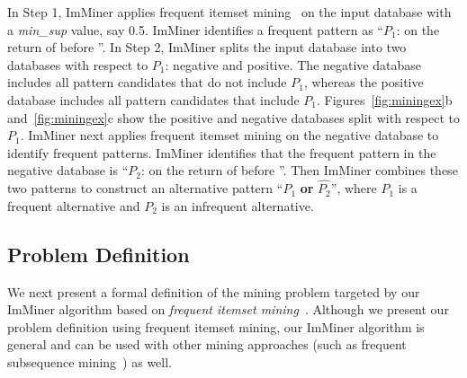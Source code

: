 In Step 1, ImMiner applies frequent itemset mining~\cite{Burdick01mafia} on the input database with a \emph{min\_sup} value, say 0.5. ImMiner identifies a frequent pattern as ``$P_1$:  on the return of  before ''. In Step 2, ImMiner splits the input database into two databases with respect to $P_1$: negative and positive. The negative database includes all pattern candidates that do not include $P_1$, whereas the positive database includes all pattern candidates that include $P_1$. Figures~\ref{fig:miningex}b and~\ref{fig:miningex}c show the positive and negative databases split with respect to $P_1$. ImMiner next applies frequent itemset mining on the negative database to identify frequent patterns. ImMiner identifies that the frequent pattern in the negative database is  ``$P_2$:  on the return of  before ''. Then ImMiner combines these two patterns to construct an alternative pattern ``$P_1$ \textbf{or} $\hat{P_2}$'', where $P_1$ is a frequent alternative and $P_2$ is an infrequent alternative.

\subsection{Problem Definition}
\label{sec:probdef}

We next present a formal definition of the mining problem targeted by our ImMiner algorithm based on \emph{frequent itemset mining}~\cite{Burdick01mafia}. Although we present our problem definition using frequent itemset mining, our ImMiner algorithm is general and can be used with other mining approaches (such as frequent subsequence mining~\cite{wang:bide}) as well.

